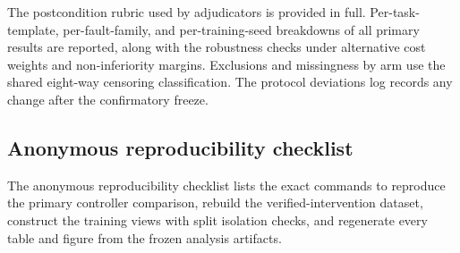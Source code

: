 The postcondition rubric used by adjudicators is provided in full.
Per-task-template, per-fault-family, and per-training-seed breakdowns of all
primary results are reported, along with the robustness checks under
alternative cost weights and non-inferiority margins. Exclusions and
missingness by arm use the shared eight-way censoring classification.
The protocol deviations log records any change after the confirmatory
freeze.

\subsection{Anonymous reproducibility checklist}

The anonymous reproducibility checklist lists the exact commands to reproduce
the primary controller comparison, rebuild the verified-intervention dataset,
construct the training views with split isolation checks, and regenerate
every table and figure from the frozen analysis artifacts.
